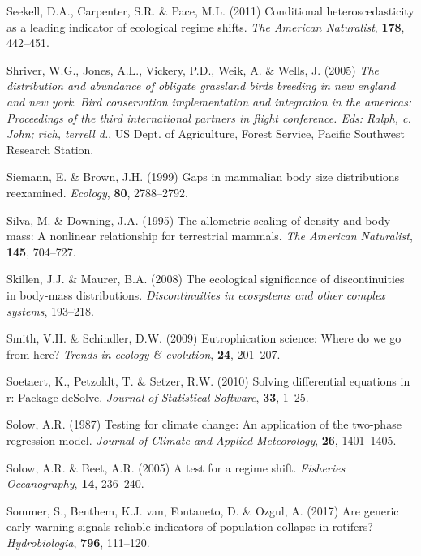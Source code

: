 \documentclass[print]{nuthesis}
\begin{document}
\leavevmode\hypertarget{ref-seekell2011conditional}{}%
Seekell, D.A., Carpenter, S.R. \& Pace, M.L. (2011) Conditional heteroscedasticity as a leading indicator of ecological regime shifts. \emph{The American Naturalist}, \textbf{178}, 442--451.

\leavevmode\hypertarget{ref-shriver2005distribution}{}%
Shriver, W.G., Jones, A.L., Vickery, P.D., Weik, A. \& Wells, J. (2005) \emph{The distribution and abundance of obligate grassland birds breeding in new england and new york}. \emph{Bird conservation implementation and integration in the americas: Proceedings of the third international partners in flight conference. Eds: Ralph, c. John; rich, terrell d.}, US Dept. of Agriculture, Forest Service, Pacific Southwest Research Station.

\leavevmode\hypertarget{ref-siemann1999gaps}{}%
Siemann, E. \& Brown, J.H. (1999) Gaps in mammalian body size distributions reexamined. \emph{Ecology}, \textbf{80}, 2788--2792.

\leavevmode\hypertarget{ref-silva1995allometric}{}%
Silva, M. \& Downing, J.A. (1995) The allometric scaling of density and body mass: A nonlinear relationship for terrestrial mammals. \emph{The American Naturalist}, \textbf{145}, 704--727.

\leavevmode\hypertarget{ref-skillen2008ecological}{}%
Skillen, J.J. \& Maurer, B.A. (2008) The ecological significance of discontinuities in body-mass distributions. \emph{Discontinuities in ecosystems and other complex systems}, 193--218.

\leavevmode\hypertarget{ref-smith2009eutrophication}{}%
Smith, V.H. \& Schindler, D.W. (2009) Eutrophication science: Where do we go from here? \emph{Trends in ecology \& evolution}, \textbf{24}, 201--207.

\leavevmode\hypertarget{ref-deSolve}{}%
Soetaert, K., Petzoldt, T. \& Setzer, R.W. (2010) Solving differential equations in r: Package deSolve. \emph{Journal of Statistical Software}, \textbf{33}, 1--25.

\leavevmode\hypertarget{ref-solow1987testing}{}%
Solow, A.R. (1987) Testing for climate change: An application of the two-phase regression model. \emph{Journal of Climate and Applied Meteorology}, \textbf{26}, 1401--1405.

\leavevmode\hypertarget{ref-solow_test_2005}{}%
Solow, A.R. \& Beet, A.R. (2005) A test for a regime shift. \emph{Fisheries Oceanography}, \textbf{14}, 236--240.

\leavevmode\hypertarget{ref-sommer2017generic}{}%
Sommer, S., Benthem, K.J. van, Fontaneto, D. \& Ozgul, A. (2017) Are generic early-warning signals reliable indicators of population collapse in rotifers? \emph{Hydrobiologia}, \textbf{796}, 111--120.
\end{document}
